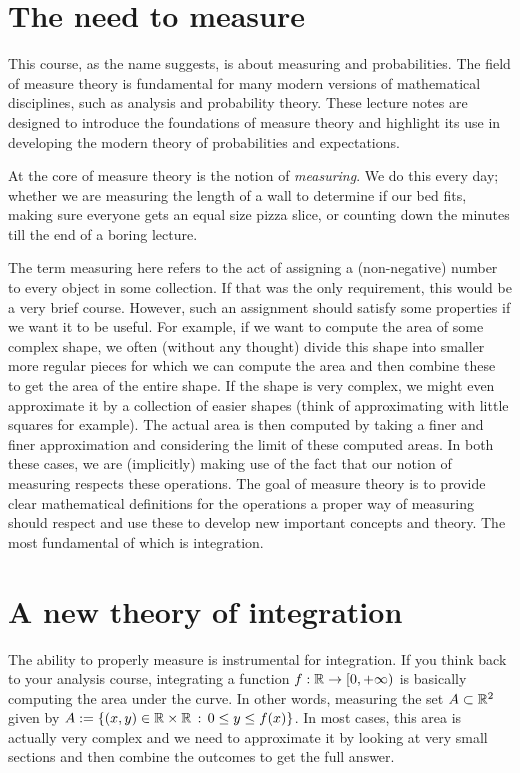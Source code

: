 \section{The need to measure}
This course, as the name suggests, is about measuring and probabilities. The field of measure theory is fundamental for many modern versions of mathematical disciplines, such as analysis and probability theory. These lecture notes are designed to introduce the foundations of measure theory and highlight its use in developing the modern theory of probabilities and expectations.  

At the core of measure theory is the notion of \emph{measuring}. We do this every day; whether we are measuring the length of a wall to determine if our bed fits, making sure everyone gets an equal size pizza slice, or counting down the minutes till the end of a boring lecture. 

The term measuring here refers to the act of assigning a (non-negative) number to every object in some collection. If that was the only requirement, this would be a very brief course. However, such an assignment should satisfy some properties if we want it to be useful. For example, if we want to compute the area of some complex shape, we often (without any thought) divide this shape into smaller more regular pieces for which we can compute the area and then combine these to get the area of the entire shape. If the shape is very complex, we might even approximate it by a collection of easier shapes (think of approximating with little squares for example). The actual area is then computed by taking a finer and finer approximation and considering the limit of these computed areas. In both these cases, we are (implicitly) making use of the fact that our notion of measuring respects these operations. The goal of measure theory is to provide clear mathematical definitions for the operations a proper way of measuring should respect and use these to develop new important concepts and theory. The most fundamental of which is integration. 

\section{A new theory of integration}

The ability to properly measure is instrumental for integration. If you think back to your analysis course, integrating a function $f : \mathbb R \to [0,+\infty)$ is basically computing the area under the curve. In other words, measuring the set $A \subset \mathbb R^2$ given by $A := \{(x,y)\in \mathbb R\times\mathbb R \, :\, 0\le y\le f(x)\}$. In most cases, this area is actually very complex and we need to approximate it by looking at very small sections and then combine the outcomes to get the full answer.

